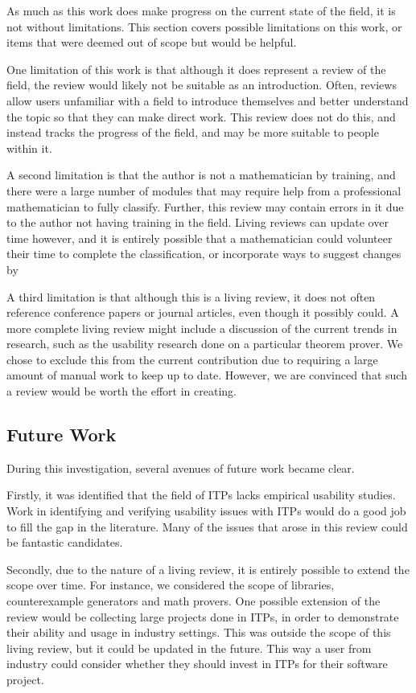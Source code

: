 \documentclass[
]{article}
\begin{document}
As much as this work does make progress on the current state of the
field, it is not without limitations. This section covers possible
limitations on this work, or items that were deemed out of scope but
would be helpful.

One limitation of this work is that although it does represent a review
of the field, the review would likely not be suitable as an
introduction. Often, reviews allow users unfamiliar with a field to
introduce themselves and better understand the topic so that they can
make direct work. This review does not do this, and instead tracks the
progress of the field, and may be more suitable to people within it.

A second limitation is that the author is not a mathematician by
training, and there were a large number of modules that may require help
from a professional mathematician to fully classify. Further, this
review may contain errors in it due to the author not having training in
the field. Living reviews can update over time however, and it is
entirely possible that a mathematician could volunteer their time to
complete the classification, or incorporate ways to suggest changes by

A third limitation is that although this is a living review, it does not
often reference conference papers or journal articles, even though it
possibly could. A more complete living review might include a discussion
of the current trends in research, such as the usability research done
on a particular theorem prover. We chose to exclude this from the
current contribution due to requiring a large amount of manual work to
keep up to date. However, we are convinced that such a review would be
worth the effort in creating.

\hypertarget{future-work}{%
\subsection{Future Work}\label{future-work}}

During this investigation, several avenues of future work became clear.

Firstly, it was identified that the field of ITPs lacks empirical
usability studies. Work in identifying and verifying usability issues
with ITPs would do a good job to fill the gap in the literature. Many of
the issues that arose in this review could be fantastic candidates.

Secondly, due to the nature of a living review, it is entirely possible
to extend the scope over time. For instance, we considered the scope of
libraries, counterexample generators and math provers. One possible
extension of the review would be collecting large projects done in ITPs,
in order to demonstrate their ability and usage in industry settings.
This was outside the scope of this living review, but it could be
updated in the future. This way a user from industry could consider
whether they should invest in ITPs for their software project.
\end{document}
